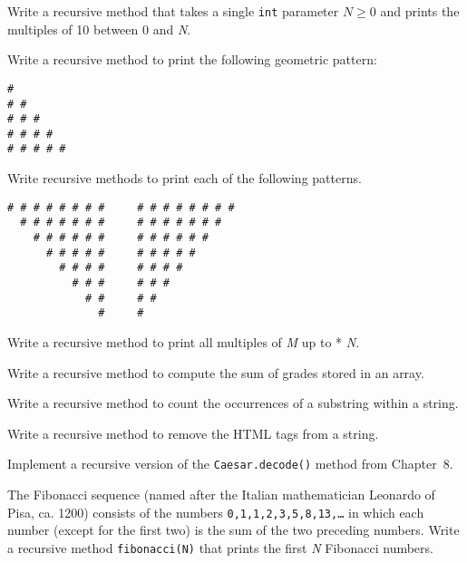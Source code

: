 \begin{EXRtwo}
\item
Write a recursive method that takes a single {\tt int} parameter $N \geq 0$
and prints the multiples of 10 between 0 and {\it N}.

\item  %
Write a recursive method to print the following geometric \mbox{pattern:}

\begin{jjjlisting}
\begin{lstlisting}
#
# #
# # #
# # # #
# # # # #
\end{lstlisting}
\end{jjjlisting}

\item  Write recursive methods to print each of the following
\mbox{patterns.}

\begin{jjjlisting}
\begin{lstlisting}
# # # # # # # #     # # # # # # # #
  # # # # # # #     # # # # # # #
    # # # # # #     # # # # # #
      # # # # #     # # # # #
        # # # #     # # # #
          # # #     # # #
            # #     # #
              #     #
\end{lstlisting}
\end{jjjlisting}

\item  Write a recursive method to print all multiples of {\it M} up
to  * {\it N}.

\item  Write a recursive method to compute the sum of grades stored in an array.


\item  Write a recursive method to count the occurrences of
a substring within a string.

\item  Write a recursive method to remove the HTML tags
from a string.

\item  Implement a recursive version of the {\tt Caesar.decode()}
method from Chapter~8.

\item  The Fibonacci sequence
(named after the Italian mathematician Leonardo of Pisa, ca.  1200)
consists of the numbers {\tt 0,1,1,2,3,5,8,13,\dots }  in which each number
(except for the first two) is the sum of the two preceding
numbers.  Write a recursive method {\tt fibonacci(N)} that prints the
first {\it N} Fibonacci numbers.


\end{EXRtwo}
